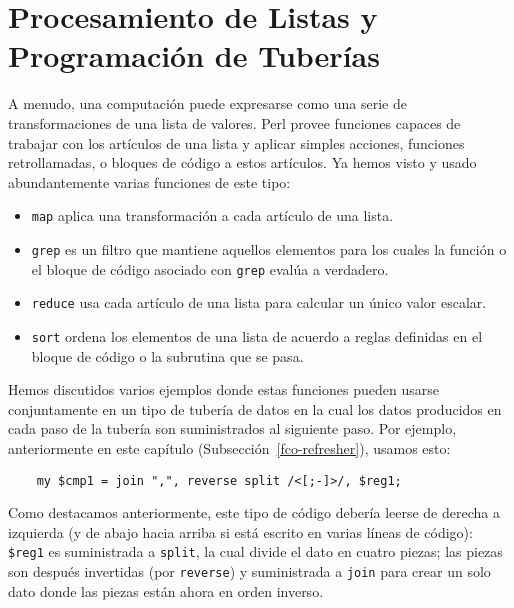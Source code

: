 \section{Procesamiento de Listas y Programación de Tuberías}


A menudo, una computación puede expresarse como una
serie de transformaciones de una lista de valores. Perl
provee funciones capaces de trabajar con los artículos de una
lista y aplicar simples acciones, funciones retrollamadas, 
o bloques de código a estos artículos. Ya hemos visto y usado
abundantemente varias funciones de este tipo:

\begin{itemize}
\item {\tt map} aplica una transformación a cada artículo de una lista.
 
\item {\tt grep} es un filtro que mantiene aquellos elementos para los cuales
la función o el bloque de código asociado con {\tt grep} evalúa a verdadero.
 
\item {\tt reduce} usa cada artículo de una lista para calcular un único 
valor escalar.
 
\item {\tt sort} ordena los elementos de una lista de acuerdo a reglas
definidas en el bloque de código o la subrutina que se pasa.
 
\end{itemize}

Hemos discutidos varios ejemplos donde estas funciones pueden
usarse conjuntamente en un tipo de tubería de datos en la cual
los datos producidos en cada paso de la tubería son suministrados
al siguiente paso. Por ejemplo, anteriormente en este capítulo 
(Subsección~\ref{fco-refresher}), usamos esto:

\begin{verbatim}
    my $cmp1 = join ",", reverse split /<[;-]>/, $reg1;
\end{verbatim}
 
 
 

Como destacamos anteriormente, este tipo de código debería leerse
de derecha a izquierda (y de abajo hacia arriba si está escrito 
en varias líneas de código): \verb|$reg1| es suministrada a {\tt split}, 
la cual divide el dato en cuatro piezas; las piezas son después 
invertidas (por {\tt reverse}) y suministrada a {\tt join} para 
crear un solo dato donde las piezas están ahora en orden inverso.

